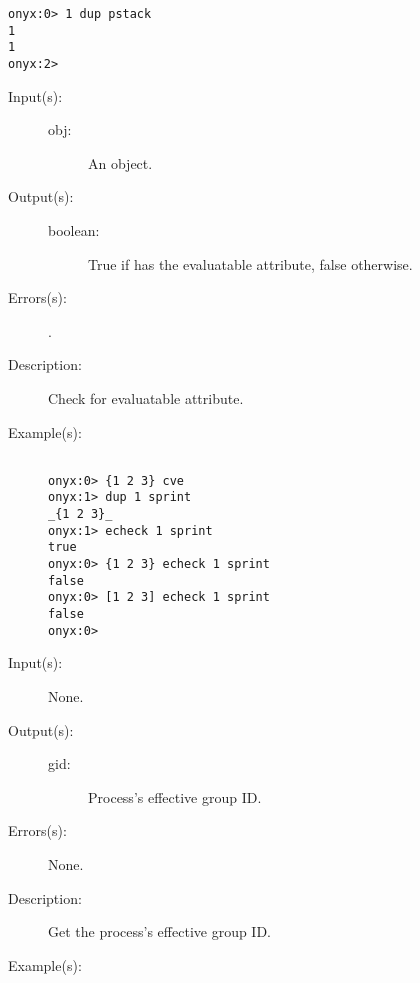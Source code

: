 \begin{description}
\begin{description}
\begin{verbatim}
onyx:0> 1 dup pstack
1
1
onyx:2>
		\end{verbatim}
	\end{description}
\label{systemdict:echeck}
\item[{\onyxop{obj}{echeck}{boolean}}: ]
	\begin{description}\item[]
	\item[Input(s): ]
		\begin{description}\item[]
		\item[obj: ]
			An object.
		\end{description}
	\item[Output(s): ]
		\begin{description}\item[]
		\item[boolean: ]
			True if  has the evaluatable attribute,
			false otherwise.
		\end{description}
	\item[Errors(s): ]
		\begin{description}\item[]
		\item[.]
		\end{description}
	\item[Description: ]
		Check  for evaluatable attribute.
	\item[Example(s): ]\begin{verbatim}

onyx:0> {1 2 3} cve
onyx:1> dup 1 sprint
_{1 2 3}_
onyx:1> echeck 1 sprint
true
onyx:0> {1 2 3} echeck 1 sprint
false
onyx:0> [1 2 3] echeck 1 sprint
false
onyx:0>
		\end{verbatim}
	\end{description}
\label{systemdict:egid}
\item[{\onyxop{--}{egid}{gid}}: ]
	\begin{description}\item[]
	\item[Input(s): ] None.
	\item[Output(s): ]
		\begin{description}\item[]
		\item[gid: ]
			Process's effective group ID.
		\end{description}
	\item[Errors(s): ] None.
	\item[Description: ]
		Get the process's effective group ID.
	\item[Example(s): ]\begin{verbatim}


\end{verbatim}
\end{description}
\end{description}

